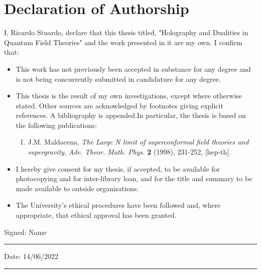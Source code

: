 \chapter*{Declaration of Authorship}

\noindent I, Ricardo Stuardo, declare that this thesis titled, "Holography and Dualities in Quantum Field Theories" and the work presented in it are my own. I confirm that:

\begin{itemize} 
\item This work has not previously been accepted in substance for any degree and is not being concurrently submitted in candidature for any degree.

\item This thesis is the result of my own investigations, except where otherwise stated. Other sources are acknowledged by footnotes giving explicit references. A bibliography is appended.In particular, the thesis is based on the following publications:
    \begin{enumerate}
        \item J.M. Maldacena, \textit{The Large N limit of superconformal field theories and supergravity}, \textit{Adv. Theor. Math. Phys.} \textbf{2} (1998), 231-252,  [hep-th].
    \end{enumerate}
    
\item I hereby give consent for my thesis, if accepted, to be available for photocopying and for inter-library loan, and for the title and summary to be made available to outside organisations.

\item The University’s ethical procedures have been followed and, where appropriate, that ethical approval has been granted.
\end{itemize} 

\vspace{0.5cm}
 
\noindent Signed: Name\\
\rule[0.5em]{25em}{0.5pt} %
 
\noindent Date: 14/06/2022\\
\rule[0.5em]{25em}{0.5pt} %